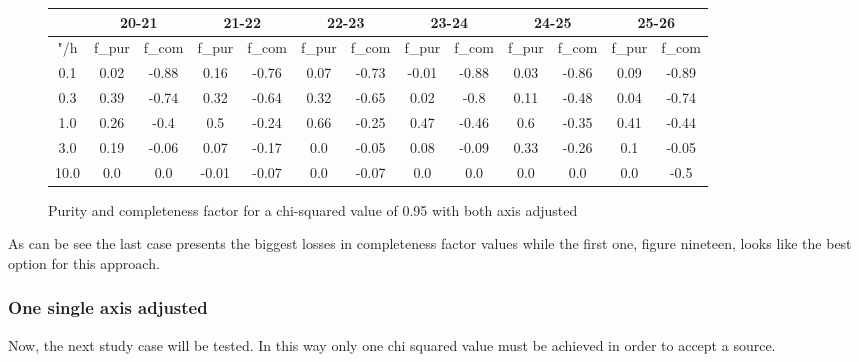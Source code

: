 \documentclass{article}
\begin{document}
\begin{figure}[H]
\centering
\begin{tabular}{|c|c|c|c|c|c|c|c|c|c|c|c|c|}
\hline
\multicolumn{1}{|c|}{} & \multicolumn{2}{|c|}{20-21} & \multicolumn{2}{|c|}{21-22} & \multicolumn{2}{|c|}{22-23} & \multicolumn{2}{|c|}{23-24} & \multicolumn{2}{|c|}{24-25} & \multicolumn{2}{|c|}{25-26}\\
\hline \hline
"/h & f\_pur & f\_com & f\_pur & f\_com & f\_pur & f\_com & f\_pur & f\_com & f\_pur & f\_com & f\_pur & f\_com \\
\hline
0.1 & 0.02 & -0.88 & 0.16 & -0.76 & 0.07 & -0.73 & -0.01 & -0.88 & 0.03 & -0.86 & 0.09 & -0.89\\
\hline
0.3 & 0.39 & -0.74 & 0.32 & -0.64 & 0.32 & -0.65 & 0.02 & -0.8 & 0.11 & -0.48 & 0.04 & -0.74\\
\hline
1.0 & 0.26 & -0.4 & 0.5 & -0.24 & 0.66 & -0.25 & 0.47 & -0.46 & 0.6 & -0.35 & 0.41 & -0.44\\
\hline
3.0 & 0.19 & -0.06 & 0.07 & -0.17 & 0.0 & -0.05 & 0.08 & -0.09 & 0.33 & -0.26 & 0.1 & -0.05\\
\hline
10.0 & 0.0 & 0.0 & -0.01 & -0.07 & 0.0 & -0.07 & 0.0 & 0.0 & 0.0 & 0.0 & 0.0 & -0.5\\
\hline
\end{tabular}
\caption{Purity and completeness factor for a chi-squared value of 0.95 with both axis adjusted}
\end{figure}

As can be see the last case presents the biggest losses in completeness factor values while the first one, figure nineteen, looks like the best option for this approach.

\subsubsection{One single axis adjusted}
Now, the next study case will be tested. In this way only one chi squared value must be achieved in order to accept a source.
\end{document}
